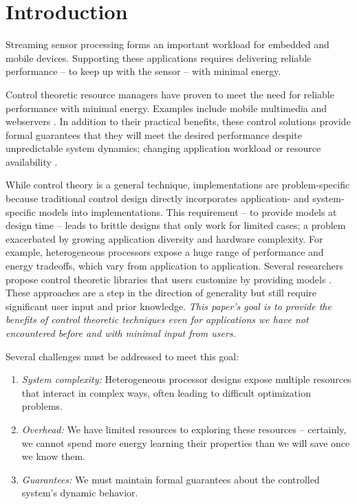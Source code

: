 \section{Introduction}

Streaming sensor processing forms an important workload for embedded
and mobile devices. Supporting these applications requires delivering
reliable performance -- to keep up with the sensor -- with minimal
energy.

Control theoretic resource managers have proven to meet the need for
reliable performance with minimal energy.  Examples include mobile
multimedia \cite{grace,grace2,Agilos} and webservers
\cite{Horvarth,Verma,sha2002queuefeedback}.  In addition to their
practical benefits, these control solutions provide formal guarantees
that they will meet the desired performance despite unpredictable
system dynamics; \eg{} changing application workload or resource
availability \cite{ICSE2014,Hellerstein2004a,KaramanolisEtAl-2005a}.

While control theory is a general technique, implementations are
problem-specific because traditional control design directly
incorporates application- and system-specific models into
implementations.  This requirement -- to provide models at design time
-- leads to brittle designs that only work for limited cases; a
problem exacerbated by growing application diversity and hardware
complexity.  For example, heterogeneous processors expose a huge range
of performance and energy tradeoffs, which vary from application to
application.  Several researchers propose control theoretic libraries
that users customize by providing models
\cite{POET,ControlWare,SWiFT}.  These approaches are a step in the
direction of generality but still require significant user input and
prior knowledge.  \emph{This paper's goal is to provide the benefits
  of control theoretic techniques even for applications we have not
  encountered before and with minimal input from users.}

Several challenges must be addressed to meet this goal:
\begin{enumerate}
\item \textit{System complexity:} Heterogeneous processor designs
  expose multiple resources that interact in complex ways, often
  leading to difficult optimization problems.
\item \textit{Overhead:} We have limited resources to exploring these
  resources -- certainly, we cannot spend more energy learning their
  properties than we will save once we know them.
\item \textit{Guarantees:} We must maintain formal guarantees about
  the controlled system's dynamic behavior.
\end{enumerate}


